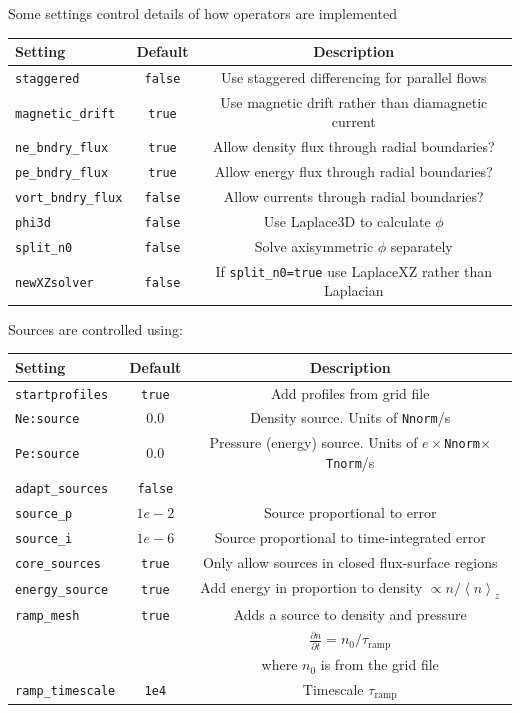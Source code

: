 \documentclass[12pt,a4paper]{article}
\begin{document}
Some settings control details of how operators are implemented
\begin{center}
\begin{tabular}{l c c}
  Setting & Default & Description \\
  \hline
  \texttt{staggered} & \texttt{false} & Use staggered differencing for parallel flows \\
  \texttt{magnetic\_drift} & \texttt{true} & Use magnetic drift rather than diamagnetic current \\
  \texttt{ne\_bndry\_flux} & \texttt{true} & Allow density flux through radial boundaries? \\
  \texttt{pe\_bndry\_flux} & \texttt{true} & Allow energy flux through radial boundaries? \\
  \texttt{vort\_bndry\_flux} & \texttt{false} & Allow currents through radial boundaries? \\
  \texttt{phi3d} & \texttt{false} & Use Laplace3D to calculate $\phi$ \\
  \texttt{split\_n0} & \texttt{false} & Solve axisymmetric $\phi$ separately \\
  \texttt{newXZsolver} & \texttt{false} & If \texttt{split\_n0=true} use LaplaceXZ rather than Laplacian  \\
  \hline
\end{tabular}
\end{center}

Sources are controlled using:
\begin{center}
\begin{tabular}{l c c}
  Setting & Default & Description \\
  \hline
  \texttt{startprofiles} & \texttt{true} & Add profiles from grid file \\
  \texttt{Ne:source} & $0.0$ & Density source. Units of \texttt{Nnorm}/s \\
  \texttt{Pe:source} & $0.0$ & Pressure (energy) source. Units of $e\times$\texttt{Nnorm}$\times$\texttt{Tnorm}/s\\
  \texttt{adapt\_sources} & \texttt{false} &  \\
  \texttt{source\_p} & $1e-2$ & Source proportional to error \\
  \texttt{source\_i} & $1e-6$ & Source proportional to time-integrated error \\
  \texttt{core\_sources} & \texttt{true} & Only allow sources in closed flux-surface regions \\
  \texttt{energy\_source} & \texttt{true} & Add energy in proportion to density $\propto n / \left<n\right>_z$ \\
  \texttt{ramp\_mesh} & \texttt{true} &  Adds a source to density and pressure \\
  & & $\frac{\partial n}{\partial t} = n_0 / \tau_\textrm{ramp}$ \\
  & & where $n_0$ is from the grid file \\
  \texttt{ramp\_timescale} & \texttt{1e4} & Timescale $\tau_\textrm{ramp}$\\
  \hline
\end{tabular}
\end{center}
\end{document}
